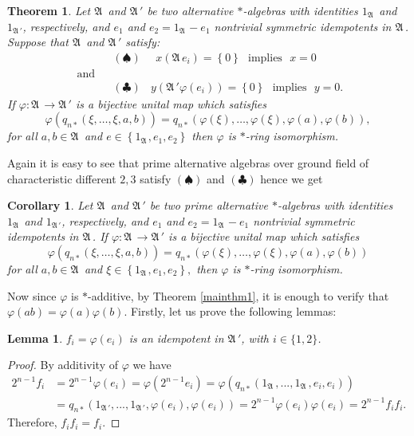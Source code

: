 \documentclass{amsart}
\newtheorem{theorem}{Theorem}[section]
\newtheorem{corollary}{Corollary}[section]
\newtheorem{lemma}{Lemma}[section]
\def\A{{\mathfrak A}\, }
\begin{document}
\begin{theorem}\label{mainthm2}
Let $\A$ and $\A'$ be two alternative $*$-algebras with identities $1_{\A}$ and $1_{\A'}$, respectively, and $e_1$ and $e_2 = 1_{\A} - e_1$ nontrivial symmetric idempotents in $\A$. Suppose that $\A$ and $\A'$ satisfy:
\begin{eqnarray*}
  &&\left(\spadesuit\right) \ \ \  \ \ \  x (\A e_i) = \left\{0\right\} \ \ \  \mbox{implies} \ \ \ x = 0 
  \\
  \mbox{ and}
	\\&& \left(\clubsuit \right) \ \ \  \ y (\A'\varphi(e_i)) = \left\{0\right\} \ \ \  \mbox{implies} \ \ \ y = 0.
\end{eqnarray*}
If $\varphi: \A \rightarrow \A'$ is a bijective unital map which satisfies
\[
\varphi(q_{n*}(\xi, \ldots, \xi, a ,b)) = q_{n*}(\varphi(\xi), \ldots, \varphi(\xi),\varphi(a),\varphi(b)),
\]
 for all $a, b \in \A$ and $e \in \left\{1_{\A},e_1, e_2\right\}$ then $\varphi$ is $*$-ring isomorphism.
 
\end{theorem}
 
 
Again it is easy to see that prime alternative algebras over ground field of characteristic different $2,3$ satisfy $\left(\spadesuit\right)$ and $\left(\clubsuit \right)$ hence we get





\begin{corollary}
Let $\A$ and $\A'$ be two prime alternative $*$-algebras with identities $1_{\A}$ and $1_{\A'}$, respectively, and $e_1$ and $e_2 = 1_{\A} - e_1$ nontrivial symmetric idempotents in $\A$. If $\varphi: \A \rightarrow \A'$ is a bijective unital map which satisfies
\[
\varphi(q_{n*}(\xi, \ldots,\xi, a,b)) = q_{n*}(\varphi(\xi),\ldots,\varphi(\xi),\varphi(a),\varphi(b))
\]
for all $a, b \in \A$ and $\xi \in \left\{1_{\A}, e_1, e_2\right\},$ then $\varphi$ is $*$-ring isomorphism.

\end{corollary}

Now since $\varphi$ is $*$-additive, by Theorem \ref{mainthm1},  it is enough to verify that $\varphi(ab) = \varphi(a)\varphi(b)$. Firstly, let us prove the following lemmas:

\begin{lemma}\label{lemam0}
 $f_i = \varphi(e_i)$ is an idempotent in $\A'$, with $i \in \{1,2\}$.
\end{lemma}
\begin{proof}
By additivity of $\varphi$ we have
 $$
 \begin{aligned}
 2^{n-1}f_i &= 2^{n-1}\varphi(e_i) = \varphi(2^{n-1}e_i) = \varphi(q_{n*}(1_\A, ...,1_\A,e_i,e_i)) \\
            &= q_{n*}(1_{\A'}, ...,1_{\A'},\varphi(e_i),\varphi(e_i)) = 2^{n-1}\varphi(e_i)\varphi(e_i) = 2^{n-1}f_if_i.
 \end{aligned}
 $$
 Therefore, $f_if_i = f_i$.
\end{proof}
\end{document}
